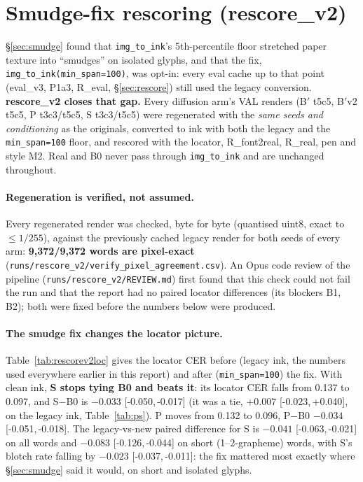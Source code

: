 \documentclass[10.5pt,a4paper]{article}
\newcommand{\fp}[1]{\nolinkurl{#1}}
\newcommand{\Bp}{B$'$}
\newcommand{\ci}[2]{{\footnotesize[#1,\,#2]}}
\begin{document}
\section{Smudge-fix rescoring (rescore\_v2)}
\label{sec:rescorev2}

\S\ref{sec:smudge} found that \texttt{img\_to\_ink}'s 5th-percentile floor stretched paper texture into ``smudges'' on
isolated glyphs, and that the fix, \texttt{img\_to\_ink(min\_span=100)}, was opt-in: every eval cache up to that point
(eval\_v3, P1a3, R\_eval, \S\ref{sec:rescore}) still used the legacy conversion. \textbf{rescore\_v2 closes that gap.} Every
diffusion arm's VAL renders (\Bp{} t5c5, \Bp{}v2 t5c5, P t3c3/t5c5, S t3c3/t5c5) were regenerated with the \emph{same seeds
and conditioning} as the originals, converted to ink with both the legacy and the \texttt{min\_span=100} floor, and rescored
with the locator, R\_font2real, R\_real, pen and style M2. Real and B0 never pass through \texttt{img\_to\_ink} and are
unchanged throughout.

\paragraph{Regeneration is verified, not assumed.} Every regenerated render was checked, byte for byte (quantised uint8,
exact to $\le1/255$), against the previously cached legacy render for both seeds of every arm: \textbf{9,372/9,372 words are
pixel-exact} (\fp{runs/rescore_v2/verify_pixel_agreement.csv}). An Opus code review of the pipeline
(\fp{runs/rescore_v2/REVIEW.md}) first found that this check could not fail the run and that the report had no paired
locator differences (its blockers B1, B2); both were fixed before the numbers below were produced.

\paragraph{The smudge fix changes the locator picture.} Table~\ref{tab:rescorev2loc} gives the locator CER before (legacy
ink, the numbers used everywhere earlier in this report) and after (\texttt{min\_span=100}) the fix. With clean ink,
\textbf{S stops tying B0 and beats it}: its locator CER falls from 0.137 to 0.097, and S$-$B0 is $-0.033$
\ci{-0.050}{-0.017} (it was a tie, $+0.007$ \ci{-0.023}{+0.040}, on the legacy ink, Table~\ref{tab:ps}). P moves from 0.132
to 0.096, P$-$B0 $-0.034$ \ci{-0.051}{-0.018}. The legacy-vs-new paired difference for S is $-0.041$ \ci{-0.063}{-0.021} on
all words and $-0.083$ \ci{-0.126}{-0.044} on short (1--2-grapheme) words, with S's blotch rate falling by $-0.023$
\ci{-0.037}{-0.011}: the fix mattered most exactly where \S\ref{sec:smudge} said it would, on short and isolated glyphs.
\end{document}
